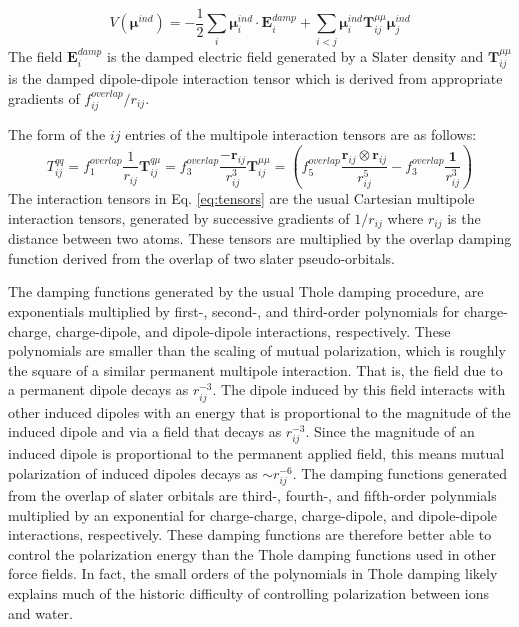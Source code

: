 \documentclass[journal=jctcce,manuscript=article]{achemso}
\begin{document}
\begin{equation}
  V(\bm{\mu}^{ind})=-\frac12\sum_i \bm{\mu}_i^{ind}\cdot \bm{E}_i^{damp} + \sum_{i<j}\bm{\mu}^{ind}_i \bm{T}^{\mu\mu}_{ij}\bm{\mu}^{ind}_j
  \label{eq:induced_dipoles}
\end{equation}
The field $\bm{E}_i^{damp}$ is the damped electric field generated by a Slater density
and $\bm{T}^{\mu\mu}_{ij}$ is the damped dipole-dipole interaction tensor which is derived from appropriate
gradients of $f_{ij}^{overlap}/r_{ij}$.

The form of the $ij$ entries of the multipole interaction tensors are as follows:
\begin{subequations}
  \begin{equation}
    T^{qq}_{ij}=f_1^{overlap}\frac{1}{r_{ij}}
    \label{eq:tensors_a}
  \end{equation}
  \begin{equation}
  \bm{T}^{q\mu}_{ij}=f_3^{overlap}\frac{-\bm{r}_{ij}}{r_{ij}^3}
    \label{eq:tensors_b}
  \end{equation}
  \begin{equation}
  \bm{T}^{\mu\mu}_{ij}=\left(f_5^{overlap}\frac{\bm{r}_{ij}\otimes\bm{r}_{ij}}{r_{ij}^5}-f_3^{overlap}\frac{\bm{1}}{r_{ij}^3}\right)
    \label{eq:tensors_c}
  \end{equation}
  \label{eq:tensors}
\end{subequations}
The interaction tensors in Eq. \ref{eq:tensors} are the usual Cartesian multipole interaction
tensors, generated by successive gradients of $1/r_{ij}$ where $r_{ij}$ is the distance between
two atoms. These tensors are multiplied by the overlap damping function derived from the overlap
of two slater pseudo-orbitals\cite{rackers2021polarizable}.

The damping functions generated by the usual Thole damping procedure\cite{thole1981molecular},
are exponentials multiplied by first-, second-, and third-order polynomials
for charge-charge, charge-dipole, and dipole-dipole interactions, respectively.\cite{thole1981molecular}
These polynomials are smaller than the scaling of mutual polarization, which is roughly the square
of a similar permanent multipole interaction. That is, the field due to a permanent dipole
decays as $r_{ij}^{-3}$. The dipole induced by this field interacts with other induced dipoles
with an energy that is proportional to the magnitude of the induced dipole and via a field
that decays as $r_{ij}^{-3}$. Since the magnitude of an induced dipole is proportional to
the permanent applied field, this means mutual polarization of induced dipoles decays as $\sim$$r_{ij}^{-6}$. The damping functions generated from the overlap of slater orbitals are
third-, fourth-, and fifth-order polynmials multiplied by an exponential for charge-charge, charge-dipole,
and dipole-dipole interactions, respectively. These damping functions are therefore better able
to control the polarization energy than the Thole damping functions used in other force fields.
In fact, the small orders of the polynomials in Thole damping likely explains much of the historic difficulty of controlling
polarization between ions and water.\cite{jiao2006simulation,mason2012accurate}
\end{document}
